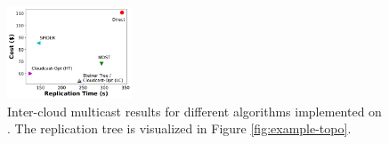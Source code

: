 \begin{figure}[tbp]
    \centering
    \includegraphics[width=
    0.33\textwidth]{figures/inter_cloud.pdf}
    \caption{Inter-cloud multicast results for different algorithms implemented on \sys{}. The \sys{} replication tree is visualized in Figure \ref{fig:example-topo}.
    }
    \label{fig:inter-cloud-1}
\end{figure}